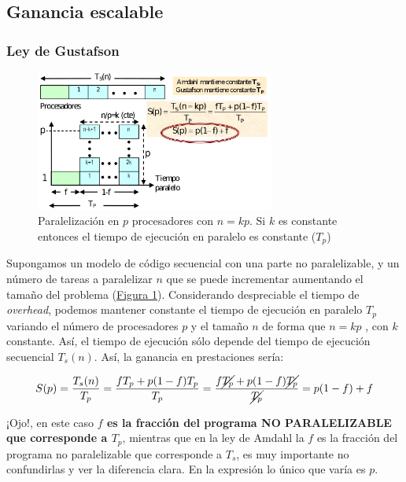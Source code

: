 \documentclass[10pt,a4paper,spanish]{report}
\begin{document}
\newpage
\textcolor[rgb]{0.2,0.4,0.8}{\subsection{Ganancia escalable}}
\textcolor[rgb]{0.2,0.4,0.8}{\subsubsection{Ley de Gustafson}}
\begin{figure}[!h]
\centering
\includegraphics[width=0.7\textwidth]{52}
\caption{Paralelización en $p$ procesadores con $n=kp$. Si $k$ es constante entonces el tiempo de ejecución en paralelo es constante ($T_p$)}
\label{ley_g}
\end{figure}

Supongamos un modelo de código secuencial con una parte no paralelizable, y un número de tareas a paralelizar $n$ que se puede incrementar aumentando el tamaño del problema (\hyperref[ley_g]{Figura \ref*{ley_g}}). Considerando despreciable el tiempo de \textcolor[rgb]{0.2,0.4,0.8}{\textit{overhead}}, podemos mantener constante el tiempo de ejecución en paralelo $T_p$ variando el número de procesadores $p$ y el tamaño $n$ de forma que $n=kp$ , con $k$ constante. Así, el tiempo de ejecución sólo depende del tiempo de ejecución secuencial $T_s(n)$. Así, la ganancia en prestaciones sería:

\begin{displaymath}
S(p) = \frac{T_s(n)}{T_p} = \frac{fT_p + p(1-f)T_p}{T_p} = \frac{f\cancel{T_p}+p(1-f)\cancel{T_p}}{\cancel{T_p}} = p(1-f) + f
\end{displaymath}

¡Ojo!, en este caso \textbf{$f$ es la fracción del programa NO PARALELIZABLE que corresponde a $T_p$}, mientras que en la ley de Amdahl la $f$ es la fracción del programa no paralelizable que corresponde a $T_s$, es muy importante no confundirlas y ver la diferencia clara. En la expresión lo único que varía es $p$.
\end{document}
